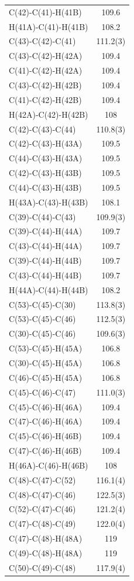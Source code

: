 \begin{center}
{\begin{supertabular}{p{1.5in}c}
C(42)-C(41)-H(41B)&109.6\\
H(41A)-C(41)-H(41B)&108.2\\
C(43)-C(42)-C(41)&111.2(3)\\
C(43)-C(42)-H(42A)&109.4\\
C(41)-C(42)-H(42A)&109.4\\
C(43)-C(42)-H(42B)&109.4\\
C(41)-C(42)-H(42B)&109.4\\
H(42A)-C(42)-H(42B)&108\\
C(42)-C(43)-C(44)&110.8(3)\\
C(42)-C(43)-H(43A)&109.5\\
C(44)-C(43)-H(43A)&109.5\\
C(42)-C(43)-H(43B)&109.5\\
C(44)-C(43)-H(43B)&109.5\\
H(43A)-C(43)-H(43B)&108.1\\
C(39)-C(44)-C(43)&109.9(3)\\
C(39)-C(44)-H(44A)&109.7\\
C(43)-C(44)-H(44A)&109.7\\
C(39)-C(44)-H(44B)&109.7\\
C(43)-C(44)-H(44B)&109.7\\
H(44A)-C(44)-H(44B)&108.2\\
C(53)-C(45)-C(30)&113.8(3)\\
C(53)-C(45)-C(46)&112.5(3)\\
C(30)-C(45)-C(46)&109.6(3)\\
C(53)-C(45)-H(45A)&106.8\\
C(30)-C(45)-H(45A)&106.8\\
C(46)-C(45)-H(45A)&106.8\\
C(45)-C(46)-C(47)&111.0(3)\\
C(45)-C(46)-H(46A)&109.4\\
C(47)-C(46)-H(46A)&109.4\\
C(45)-C(46)-H(46B)&109.4\\
C(47)-C(46)-H(46B)&109.4\\
H(46A)-C(46)-H(46B)&108\\
C(48)-C(47)-C(52)&116.1(4)\\
C(48)-C(47)-C(46)&122.5(3)\\
C(52)-C(47)-C(46)&121.2(4)\\
C(47)-C(48)-C(49)&122.0(4)\\
C(47)-C(48)-H(48A)&119\\
C(49)-C(48)-H(48A)&119\\
C(50)-C(49)-C(48)&117.9(4)\\

\end{supertabular}}
\end{center}
